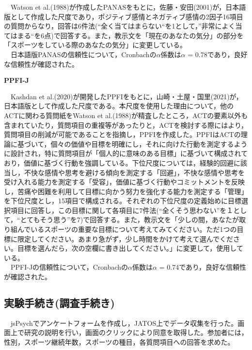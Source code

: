\documentclass[12pt,a4paper,xelatex,ja=standard]{bxjsarticle}
\begin{document}
　Watson et
al.(1988)が作成したPANASをもとに，佐藤・安田(2001)が，日本語版として作成した尺度であり，ポジティブ感情とネガティブ感情の2因子16項目の質問からなり，回答は6件法(``全く当てはまらない``を1として，''非常によく当てはまる``を6点)で回答する。また，教示文を「現在のあなたの気分」の部分を「スポーツをしている際のあなたの気分」に変更している。\\
　日本語版PANASの信頼性について，Cronbachの\(\alpha\)係数は\(\alpha\) =
0.78であり，良好な信頼性が確認された。

\textbf{PPFI-J}　

　Kashdan et
al.(2020)が開発したPPFIをもとに，山崎・土屋・国里(2021)が，日本語版として作成した尺度である。本尺度を使用した理由について，他のACTに関わる質問紙をWatson
et
al.(1988)が精査したところ，ACTの要素以外も含まれていたり，質問項目の重複等があったりと，ACTを検討する際にはより，質問項目の削減が可能であることを指摘し，PPFIを作成した。PPFIはACTの理論に基づいて，個々の価値や目標を明確にし，それに向けた行動を測定するように設計され，特に質問項目が「個人的に意味のある目標」に基づいて構成されており，価値に基づく行動を強調している。下位尺度については，経験的回避に該当し，不快な感情や思考を避ける傾向を測定する「回避」，不快な感情や思考を受け入れる能力を測定する「受容」，価値に基づく行動やコミットメントを反映し，苦痛や困難を利用して目標に向かう努力を強化する能力を測定する「管理」を下位尺度とし，15項目で構成される。それぞれの下位尺度の定義始めに目標選択項目に回答し，この目標に関して各項目に7件法(``全くそう思わない''を１として，``とてもそう思う''を7)で回答する。また，教示文を「少しの間，あなたが取り組んでいるスポーツの重要な目標について考えてみてください。ただ1つの目標に限定してください。あまり急がず，少し時間をかけて考えて選んでください。目標を選んだら，次の空欄に書き出してください。」に変更して，使用している。\\
　PPFI-Jの信頼性について，Cronbachの\(\alpha\)係数は\(\alpha\) =
0.74であり，良好な信頼性が確認された。

\hypertarget{ux5b9fux9a13ux624bux7d9aux304dux8abfux67fbux624bux7d9aux304d}{%
\subsection{実験手続き(調査手続き)}\label{ux5b9fux9a13ux624bux7d9aux304dux8abfux67fbux624bux7d9aux304d}}

　jsPsychでアンケートフォームを作成し，JATOS上でデータ収集を行った。画面上で研究の説明を行い，画面のクリックにより同意を取得した。参加者には，性別，スポーツ継続年数，スポーツの種目，各質問項目への回答を求めた。
\end{document}

